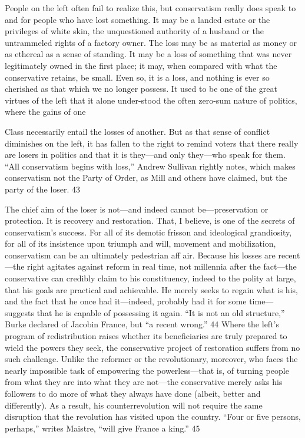  \par 
People on the left often fail to realize this, but conservatism really does speak to and for people who have lost something. It may be a landed estate or the privileges of white skin, the unquestioned authority of a husband or the untrammeled rights of a factory owner. The loss may be as material as money or as ethereal as a sense of standing. It may be a loss of something that was never legitimately owned in the first place; it may, when compared with what the conservative retains, be small. Even so, it is a loss, and nothing is ever so cherished as that which we no longer possess. It used to be one of the great virtues of the left that it alone under-stood the often zero-sum nature of politics, where the gains of one
 \par 
Class necessarily entail the losses of another. But as that sense of conflict diminishes on the left, it has fallen to the right to remind voters that there really are losers in politics and that it is they—and only they—who speak for them. “All conservatism begins with loss,” Andrew Sullivan rightly notes, which makes conservatism not the Party of Order, as Mill and others have claimed, but the party of the loser. 43
 \par 
The chief aim of the loser is not—and indeed cannot be—preservation or protection. It is recovery and restoration. That, I believe, is one of the secrets of conservatism’s success. For all of its demotic frisson and ideological grandiosity, for all of its insistence upon triumph and will, movement and mobilization, conservatism can be an ultimately pedestrian aff air. Because his losses are recent—the right agitates against reform in real time, not millennia after the fact—the conservative can credibly claim to his constituency, indeed to the polity at large, that his goals are practical and achievable. He merely seeks to regain what is his, and the fact that he once had it—indeed, probably had it for some time— suggests that he is capable of possessing it again. “It is not an old structure,” Burke declared of Jacobin France, but “a recent wrong.” 44 Where the left’s program of redistribution raises whether its beneficiaries are truly prepared to wield the powers they seek, the conservative project of restoration suffers from no such challenge. Unlike the reformer or the revolutionary, moreover, who faces the nearly impossible task of empowering the powerless—that is, of turning people from what they are into what they are not—the conservative merely asks his followers to do more of what they always have done (albeit, better and differently). As a result, his counterrevolution will not require the same disruption that the revolution has visited upon the country. “Four or five persons, perhaps,” writes Maistre, “will give France a king.” 45
